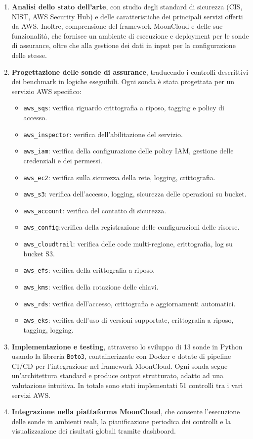 \documentclass[11pt,a4paper]{article}
\begin{document}
\begin{enumerate}
  \item \textbf{Analisi dello stato dell'arte}, con studio degli standard di sicurezza (CIS, NIST, AWS Security Hub) e delle caratteristiche dei principali servizi offerti da AWS. Inoltre, comprensione del framework MoonCloud e delle sue funzionalità, che fornisce un ambiente di esecuzione e deployment per le sonde di assurance, oltre che alla gestione dei dati in input per la configurazione delle stesse.
  
  \item \textbf{Progettazione delle sonde di assurance}, traducendo i controlli descrittivi dei benchmark in logiche eseguibili. Ogni sonda è stata progettata per un servizio AWS specifico:
  \begin{itemize}
    \item \texttt{aws\_sqs}: verifica riguardo crittografia a riposo, tagging e policy di accesso.
    \item \texttt{aws\_inspector}: verifica dell'abilitazione del servizio.
    \item \texttt{aws\_iam}: verifica della configurazione delle policy IAM, gestione delle credenziali e dei permessi.
    \item \texttt{aws\_ec2}: verifica sulla sicurezza della rete, logging, crittografia.
    \item \texttt{aws\_s3}: verifica dell'accesso, logging, sicurezza delle operazioni su bucket.
    \item \texttt{aws\_account}: verifica del contatto di sicurezza.
    \item \texttt{aws\_config}:verifica della registrazione delle configurazioni delle risorse.
    \item \texttt{aws\_cloudtrail}: verifica delle code multi-regione, crittografia, log su bucket S3.
    \item \texttt{aws\_efs}: verifica della crittografia a riposo.
    \item \texttt{aws\_kms}: verifica della rotazione delle chiavi.
    \item \texttt{aws\_rds}: verifica dell'accesso, crittografia e aggiornamenti automatici.
    \item \texttt{aws\_eks}: verifica dell'uso di versioni supportate, crittografia a riposo, tagging, logging.
  \end{itemize}
  
  \item \textbf{Implementazione e testing}, attraverso lo sviluppo di 13 sonde in Python usando la libreria \texttt{Boto3}, containerizzate con Docker e dotate di pipeline CI/CD per l'integrazione nel framework MoonCloud. Ogni sonda segue un'architettura standard e produce output strutturato, adatto ad una valutazione intuitiva. In totale sono stati implementati 51 controlli tra i vari servizi AWS.
  
  \item \textbf{Integrazione nella piattaforma MoonCloud}, che consente l'esecuzione delle sonde in ambienti reali, la pianificazione periodica dei controlli e la visualizzazione dei risultati globali tramite dashboard.
\end{enumerate}
\end{document}
